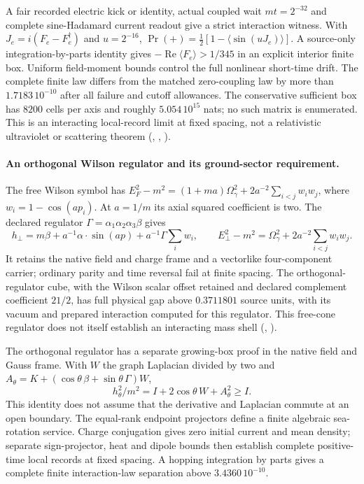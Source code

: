 A fair recorded electric kick or identity, actual coupled wait
$mt=2^{-32}$ and complete sine-Hadamard current readout give a strict
interaction witness. With $J_e=i(F_e-F_e^\dagger)$ and $u=2^{-16}$,
$\Pr(+)=\tfrac12[1-\langle\sin(uJ_e)\rangle]$.
A source-only integration-by-parts identity gives
$-\operatorname{Re}\langle F_e\rangle>1/345$ in an explicit interior
finite box. Uniform field-moment bounds control the full nonlinear
short-time drift. The complete finite law differs from the matched
zero-coupling law by more than $1.7183\,10^{-10}$ after all failure and
cutoff allowances. The conservative sufficient box has $8200$ cells per
axis and roughly $5.054\,10^{15}$ nats; no such matrix is enumerated.
This is an interacting local-record limit at fixed spacing, not a
relativistic ultraviolet or scattering theorem
(,
, \cite{ophrepo}).

\paragraph{An orthogonal Wilson regulator and its ground-sector requirement.}
The free Wilson symbol has
$E_F^2-m^2=(1+ma)\Omega_\gamma^2+2a^{-2}\sum_{i<j}w_iw_j$,
where $w_i=1-\cos(ap_i)$. At $a=1/m$ its axial squared coefficient is two.
The declared regulator $\Gamma=\alpha_1\alpha_2\alpha_3\beta$ gives
\[
 h_\perp=m\beta+a^{-1}\alpha\cdot\sin(ap)
              +a^{-1}\Gamma\sum_i w_i,
 \qquad E_\perp^2-m^2=\Omega_\gamma^2+2a^{-2}\sum_{i<j}w_iw_j.
\]
It retains the native field and charge frame and a vectorlike four-component
carrier; ordinary parity and time reversal fail at finite spacing.
The orthogonal-regulator cube, with the Wilson scalar offset retained and
declared complement coefficient $21/2$, has full physical gap above
$0.3711801$ source units, with its vacuum and prepared interaction computed
for this regulator. This free-cone regulator does not itself establish an
interacting mass shell
(, \cite{ophrepo}).

The orthogonal regulator has a separate growing-box proof in the native
field and Gauss frame. With $W$ the graph Laplacian divided by two and
$A_\theta=K+(\cos\theta\,\beta+\sin\theta\,\Gamma)W$,
\[
 h_\theta^2/m^2=I+2\cos\theta\,W+A_\theta^2\ge I.
\]
This identity does not assume that the derivative and Laplacian commute
at an open boundary. The equal-rank endpoint projectors define a finite
algebraic sea-rotation service. Charge conjugation gives zero initial
current and mean density; separate sign-projector, heat and dipole bounds
then establish complete positive-time local records at fixed spacing.
A hopping integration by parts gives a complete finite interaction-law
separation above $3.4360\,10^{-10}$.


